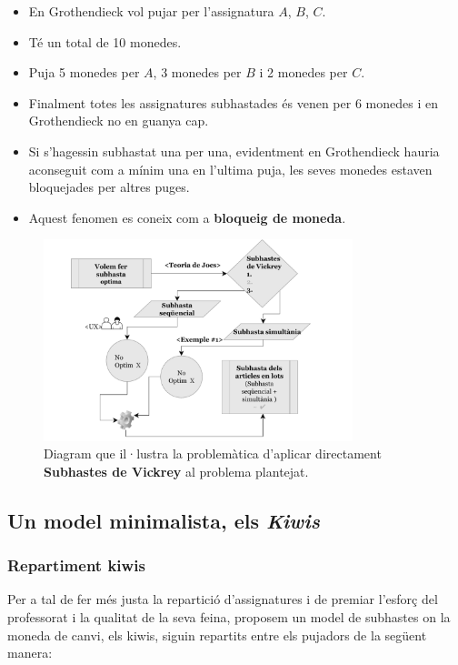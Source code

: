 \documentclass[10pt,twocolumn]{article}
\begin{document}
\begin{tcolorbox}[colback=black!1,title=\textbf{Exemple \# 1},coltitle=black,colbacktitle=black!10]
\begin{itemize}
	\item En Grothendieck vol pujar per l'assignatura $A$, $B$, $C$.
	\item Té un total de 10 monedes.
	\item Puja 5 monedes per $A$, 3 monedes per $B$ i 2 monedes per $C$.
	\item Finalment totes les assignatures subhastades és venen per 6 monedes i en Grothendieck no en guanya cap.
	\item Si s'hagessin subhastat una per una, evidentment en Grothendieck hauria aconseguit com a mínim una en l'ultima puja, les seves monedes estaven bloquejades per altres puges. \item Aquest fenomen es coneix com a \textbf{bloqueig de moneda}.
\end{itemize}
\end{tcolorbox}
\begin{figure}[!]
	\centering
	\includegraphics[width=9cm]{subs}
	\caption{ \footnotesize Diagram que il·lustra la problemàtica d'aplicar directament \textbf{Subhastes de Vickrey} al problema plantejat.}
	\label{fig:4}
\end{figure}
\subsection{Un model minimalista, els \textit{Kiwis}}
\subsubsection{Repartiment kiwis}
Per a tal de fer més justa la repartició d'assignatures i de premiar l'esforç del professorat i la qualitat de la seva feina, proposem un model de subhastes on la moneda de canvi, els kiwis, siguin repartits entre els pujadors de la següent manera:
\end{document}
